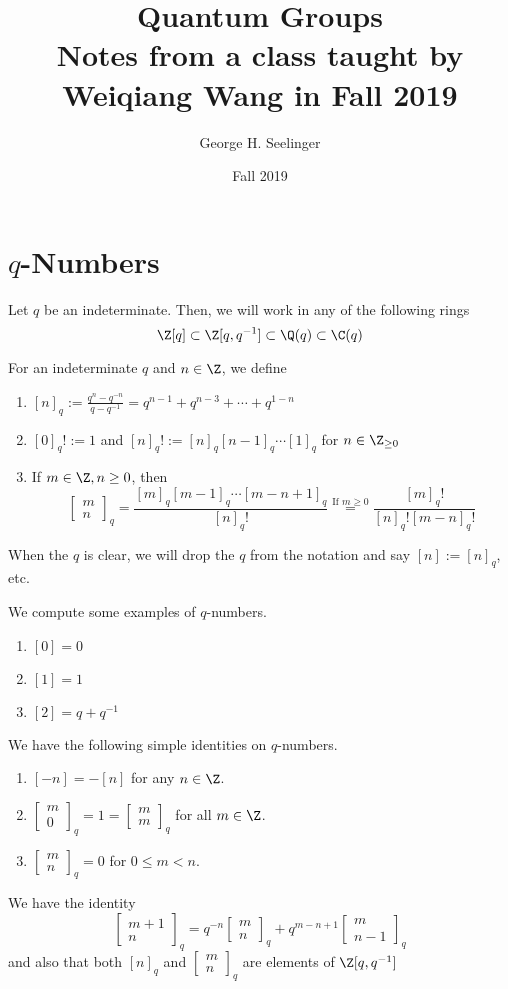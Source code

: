 \documentclass[11pt,leqno,oneside]{amsbook}
\title[Quantum Groups]{Quantum Groups \\ Notes
  from a class taught by Weiqiang Wang in Fall 2019}
\author{George H. Seelinger}
\date{Fall 2019}
\numberwithin{thm}{section}
\newcommand{\qfactorial}[1]{[#1]_q!}
\newcommand{\qbinom}[3][q]{\left[\begin{array}{c}#2\\#3\end{array}\right]_{#1}}
\begin{document}
\maketitle
\section{\(q\)-Numbers}
Let \(q\) be an indeterminate. Then, we will work in any of the
following rings \[
  \Z[q] \subset \Z[q,q^{-1}] \subset \Q(q) \subset \C(q)
\]
\begin{defn}
  For an indeterminate \(q\) and \(n \in \Z\), we define
  \begin{enumerate}
  \item \([n]_q := \frac{q^n-q^{-n}}{q-q^{-1}} = q^{n-1} + q^{n-3} +
    \cdots + q^{1-n}\)
  \item \(\qfactorial{0} := 1\) and \(\qfactorial{n} := [n]_q [n-1]_q
    \cdots [1]_q\) for \(n \in \Z_{\geq 0}\)
  \item If \(m \in \Z, n \geq 0\), then \[
      \qbinom{m}{n} = \frac{[m]_q [m-1]_q \cdots
        [m-n+1]_q}{\qfactorial{n}} \overset{\text{If }m \geq 0}{=} \frac{\qfactorial{m}}{\qfactorial{n}\qfactorial{m-n}}
    \]
  \end{enumerate}
\end{defn}
\begin{rmk}
  When the \(q\) is clear, we will drop the \(q\) from the notation
  and say \([n] := [n]_q\), etc.
\end{rmk}
\begin{example}
  We compute some examples of \(q\)-numbers.
  \begin{enumerate}
  \item \([0] = 0\)
  \item \([1] = 1\)
  \item \([2] = q+q^{-1}\)
  \end{enumerate}
\end{example}
\begin{prop}
  We have the following simple identities on \(q\)-numbers.
  \begin{enumerate}
  \item \([-n] = -[n]\) for any \(n \in \Z\).
  \item \(\qbinom{m}{0} = 1 = \qbinom{m}{m}\) for all \(m \in \Z\).
  \item \(\qbinom{m}{n} = 0\) for \(0 \leq m < n\).
  \end{enumerate}
\end{prop}
\begin{prop}\label{q-pascal-identity}
  We have the identity \[
    \qbinom{m+1}{n} = q^{-n} \qbinom{m}{n} + q^{m-n+1} \qbinom{m}{n-1}
  \]
  and also that both \([n]_q\) and \(\qbinom{m}{n}\) are elements of
  \(\Z[q,q^{-1}]\) 
\end{prop}
\end{document}
